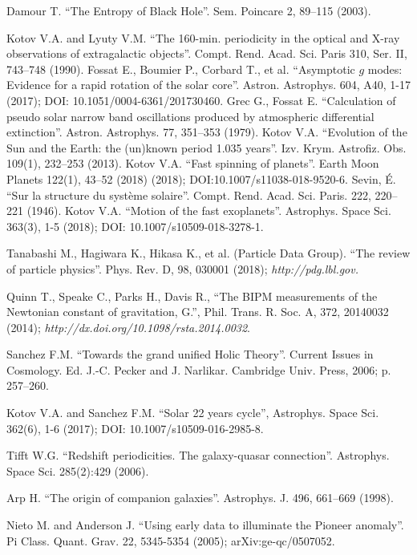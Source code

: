 \documentclass[twoside,draft]{article}
\begin{document}
\begin{sloppypar}
\begin{thebibliography}{99}
 Damour T. ``The Entropy of Black Hole''. Sem. Poincare 2, 89--115 (2003).

 Kotov V.A. and Lyuty V.M. ``The 160-min. periodicity in the optical
and X-ray observations of extragalactic objects''. Compt. Rend. Acad. Sci.
Paris 310, Ser. II, 743--748 (1990). Fossat E., Boumier P., Corbard T., et al.
``Asymptotic $g$ modes: Evidence for a rapid rotation of the solar core''.
Astron. Astrophys. 604, A40, 1-17 (2017); DOI: 10.1051/0004-6361/201730460.
Grec G., Fossat E. ``Calculation of pseudo solar narrow band oscillations
produced by atmospheric differential extinction''. Astron. Astrophys. 77,
351--353 (1979). Kotov V.A. ``Evolution of the Sun and the Earth: the (un)known
period 1.035 years''. Izv. Krym. Astrofiz. Obs. 109(1), 232--253 (2013).
Kotov V.A. ``Fast spinning of planets''. Earth Moon Planets 122(1), 43--52
(2018) (2018); DOI:10.1007/s11038-018-9520-6. Sevin, \'E. ``Sur la structure du
syst\`eme solaire''. Compt. Rend. Acad. Sci. Paris. 222, 220--221 (1946).
Kotov V.A. ``Motion of the fast exoplanets''. Astrophys. Space Sci. 363(3), 1-5
(2018); DOI: 10.1007/s10509-018-3278-1.

 Tanabashi M., Hagiwara K., Hikasa K., et al. (Particle Data
Group). ``The review of particle physics''. Phys. Rev. D, 98, 030001 (2018);
{\it http://pdg.lbl.gov.}

 Quinn T., Speake C., Parks H., Davis R., ``The BIPM measurements
of the Newtonian constant of gravitation, G.'', Phil. Trans. R. Soc. A, 372,
20140032 (2014); {\it http://dx.doi.org/10.1098/rsta.2014.0032}.

 Sanchez F.M. ``Towards the grand unified Holic Theory''. Current
Issues in Cosmology. Ed. J.-C. Pecker and J. Narlikar. Cambridge Univ. Press,
2006; p. 257--260.

 Kotov V.A. and Sanchez F.M. ``Solar 22 years cycle'', Astrophys.
Space Sci. 362(6), 1-6 (2017); DOI: 10.1007/s10509-016-2985-8.

 Tifft W.G. ``Redshift periodicities. The galaxy-quasar
connection''. Astrophys. Space Sci. 285(2):429 (2006).

 Arp H. ``The origin of companion galaxies''. Astrophys. J. 496,
661--669 (1998).

 Nieto M. and Anderson J. ``Using early data to illuminate the
Pioneer anomaly''. Pi Class. Quant. Grav. 22, 5345-5354 (2005);
arXiv:ge-qc/0507052.


\end{thebibliography}
\end{sloppypar}
\end{document}
